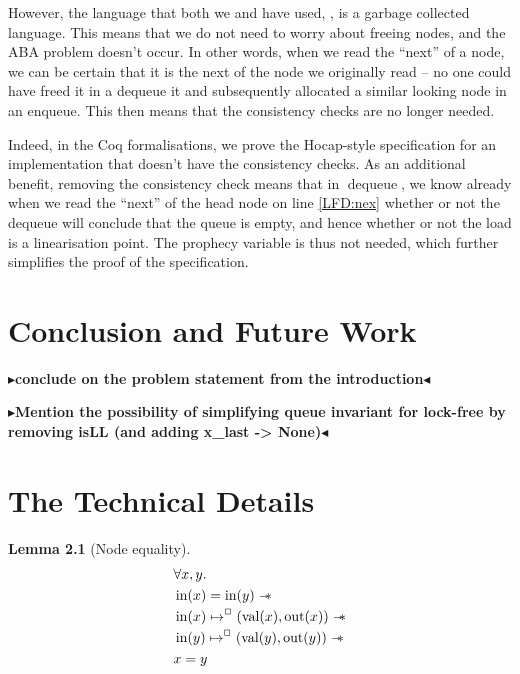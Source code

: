 \documentclass[a4paper, 10pt]{report}
\theoremstyle{definition}
\newtheorem{lemma}[theorem]{Lemma}
\newcommand{\dequeue}{\operatorname{dequeue}}
\newcommand{\nIn}[1]{\operatorname{in}(#1)}
\newcommand{\nVal}[1]{\operatorname{val}(#1)}
\newcommand{\nOut}[1]{\operatorname{out}(#1)}
\newcommand{\isNode}[1]{\nIn{#1} \mapsto^{\persistently} (\nVal{#1}, \nOut{#1})}
\newcommand{\todo}[1]{{\color[rgb]{.5,0,0}\textbf{$\blacktriangleright$#1$\blacktriangleleft$}}}
\begin{document}
However, the language that both we and \cite{DBLP:conf/cpp/VindumB21} have used, \heaplang, is a garbage collected language. This means that we do not need to worry about freeing nodes, and the ABA problem doesn't occur. In other words, when we read the ``next'' of a node, we can be certain that it is the next of the node we originally read -- no one could have freed it in a dequeue it and subsequently allocated a similar looking node in an enqueue. This then means that the consistency checks are no longer needed. 

Indeed, in the Coq formalisations, we prove the Hocap-style specification for an implementation that doesn't have the consistency checks. As an additional benefit, removing the consistency check means that in $\dequeue$, we know already when we read the ``next'' of the head node on line \ref{LFD:nex} whether or not the dequeue will conclude that the queue is empty, and hence whether or not the load is a linearisation point. The prophecy variable is thus not needed, which further simplifies the proof of the specification.


\chapter{Conclusion and Future Work}
\label{ch:conclusion_fw}

\todo{conclude on the problem statement from the introduction}

\todo{Mention the possibility of simplifying queue invariant for lock-free by removing isLL (and adding x\_last -> None)}


\cleardoublepage
{}




\cleardoublepage
\appendix
\chapter{The Technical Details}

\begin{lemma}[Node equality]\label{lemma:nIn-equal}
  \begin{align*}
    &\All x, y.\\
    &\nIn{x} = \nIn{y} \wand\\
    &\isNode{x} \wand\\
    &\isNode{y} \wand\\
    &x = y
  \end{align*}
\end{lemma}
\end{document}
